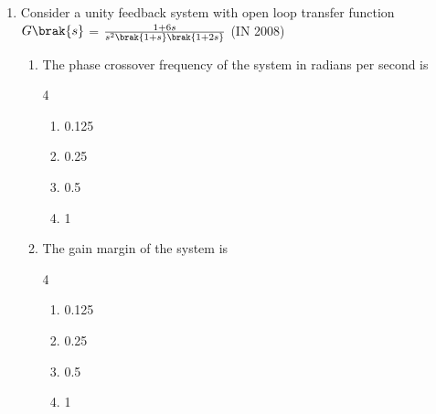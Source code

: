 \begin{enumerate}[label=\thesubsection.\arabic*,ref=\thesubsection.\theenumi]
\item Consider a unity feedback system with open loop transfer function $G\brak{s}$ = $\frac{1+ 6s}{s^2\brak{1+s}\brak{1+2s}}$
\hfill{(IN 2008)}
           \begin{enumerate} 
\item The phase crossover frequency of the system in radians per second is 
\begin{multicols}{4}
           \begin{enumerate} 
              \item 0.125            
              \item 0.25
              \item 0.5
              \item 1
            \end{enumerate}
            \end{multicols}
\item The gain margin of the system is 
\begin{multicols}{4}
           \begin{enumerate} 
              \item  0.125          
              \item  0.25
              \item  0.5
              \item  1
            \end{enumerate}
            \end{multicols}
\end{enumerate}



\end{enumerate}
